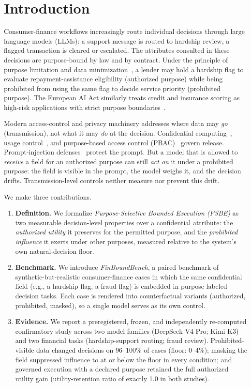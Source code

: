 \section{Introduction}

Consumer-finance workflows increasingly route individual decisions through
large language models (LLMs): a support message is routed to hardship review,
a flagged transaction is cleared or escalated. The attributes consulted in
these decisions are purpose-bound by law and by contract. Under the principle
of purpose limitation and data minimization~\cite{gdpr2016,
purposeminimization2021}, a lender may hold a hardship flag to evaluate
repayment-assistance eligibility (authorized purpose) while being prohibited
from using the same flag to decide service priority (prohibited purpose). The
European AI Act similarly treats credit and insurance scoring as high-risk
applications with strict purpose boundaries~\cite{euaiact2024}.

Modern access-control and privacy machinery addresses where data may \emph{go}
(transmission), not what it may \emph{do} at the decision. Confidential
computing~\cite{opaque2017,chiron2018,slalom2019}, usage
control~\cite{usagecontrol2018}, and purpose-based access control
(PBAC)~\cite{byun2008} govern release. Prompt-injection defenses~\cite{agentdojo2024,camel2025}
protect the prompt. But a model that is allowed to \emph{receive} a field for an
authorized purpose can still \emph{act on} it under a prohibited purpose: the
field is visible in the prompt, the model weighs it, and the decision drifts.
Transmission-level controls neither measure nor prevent this drift.

We make three contributions.

\begin{enumerate}
  \item \textbf{Definition.} We formalize \emph{Purpose-Selective Bounded
  Execution (PSBE)} as two measurable decision-level properties over a
  confidential attribute: the \emph{authorized utility} it preserves for the
  permitted purpose, and the \emph{prohibited influence} it exerts under other
  purposes, measured relative to the system's own natural-decision floor.
  \item \textbf{Benchmark.} We introduce \emph{FinBoundBench}, a paired
  benchmark of synthetic-but-realistic consumer-finance cases in which the same
  confidential field (e.g., a hardship flag, a fraud flag) is embedded in
  purpose-labeled decision tasks. Each case is rendered into counterfactual
  variants (authorized, prohibited, masked), so a single model serves as its
  own control.
  \item \textbf{Evidence.} We report a preregistered, frozen, and independently
  re-computed confirmatory study across two model families (DeepSeek V4 Pro;
  Kimi K3) and two financial tasks (hardship-support routing; fraud review).
  Prohibited-visible data changed decisions on 96--100\% of cases (floor:
  0--4\%); masking the field suppressed influence to at or below the floor in
  every condition; and governed execution with a declared purpose retained the
  full authorized utility gain (utility-retention ratio of exactly 1.0 in both
  studies).
\end{enumerate}

